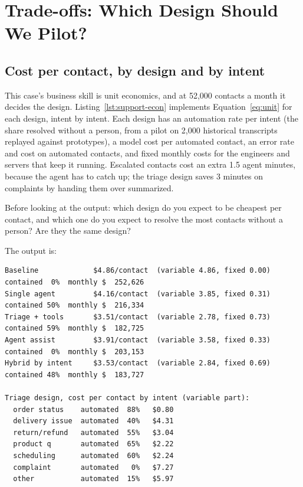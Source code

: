 \section{Trade-offs: Which Design Should We Pilot?}
\label{sec:support-tradeoffs}

\subsection{Cost per contact, by design and by intent}

This case's business skill is unit economics, and at 52{,}000 contacts a month it decides the design. Listing~\ref{lst:support-econ} implements Equation~\eqref{eq:unit} for each design, intent by intent. Each design has an automation rate per intent (the share resolved without a person, from a pilot on 2{,}000 historical transcripts replayed against prototypes), a model cost per automated contact, an error rate and cost on automated contacts, and fixed monthly costs for the engineers and servers that keep it running. Escalated contacts cost an extra 1.5 agent minutes, because the agent has to catch up; the triage design saves 3 minutes on complaints by handing them over summarized.



\begin{thinkabout}
Before looking at the output: which design do you expect to be cheapest per contact, and which one do you expect to resolve the most contacts without a person? Are they the same design?
\end{thinkabout}

The output is:
\begin{lstlisting}[language={}, numbers=none, frame=none, xleftmargin=0em, basicstyle=\ttfamily\scriptsize]
Baseline             $4.86/contact  (variable 4.86, fixed 0.00)  contained  0%  monthly $  252,626
Single agent         $4.16/contact  (variable 3.85, fixed 0.31)  contained 50%  monthly $  216,334
Triage + tools       $3.51/contact  (variable 2.78, fixed 0.73)  contained 59%  monthly $  182,725
Agent assist         $3.91/contact  (variable 3.58, fixed 0.33)  contained  0%  monthly $  203,153
Hybrid by intent     $3.53/contact  (variable 2.84, fixed 0.69)  contained 48%  monthly $  183,727

Triage design, cost per contact by intent (variable part):
  order status    automated  88%   $0.80
  delivery issue  automated  40%   $4.31
  return/refund   automated  55%   $3.04
  product q       automated  65%   $2.22
  scheduling      automated  60%   $2.24
  complaint       automated   0%   $7.27
  other           automated  15%   $5.97
\end{lstlisting}


